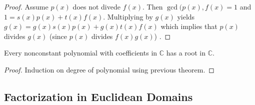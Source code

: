 \documentclass[english,course]{lecture}
\newenvironment{hint}{\startimportant}{}
\def\startimportant#1\end{[{Hint:} #1]\end}
\theoremstyle{plain}
\def\C{{\mathbb C}}
\def\presnotes{}
\begin{document}
\begin{proof}
	Assume $p(x)$ does not divede $f(x)$. Then $\gcd(p(x),f(x)=1$ and $1=s(x)p(x)+t(x)f(x)$. Multiplying by $g(x)$ yields $g(x)=g(x)s(x)p(x)+g(x)t(x)f(x)$ which implies that $p(x)$ divides $g(x)$ (since $p(x)$ divides $f(x)g(x)$) .
\end{proof}

\presnotes










\begin{unnumberedtheorem}
	Every nonconstant polynomial with coefficients in $\C$ has a root in $\C$.
\end{unnumberedtheorem}



\begin{proof}
	Induction on degree of polynomial using previous theorem.
\end{proof}

\presnotes





\subsection{Factorization in Euclidean Domains}
\end{document}
